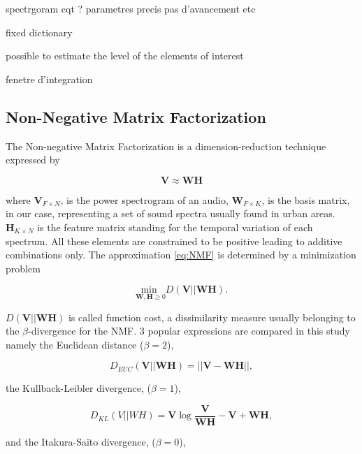 \documentclass{article}
\begin{document}
\begin{sloppy}
spectrgoram cqt ? parametres precis pas d'avancement etc

fixed dictionary

possible to estimate the level of the elements of interest

fenetre d'integration

\subsection{Non-Negative Matrix Factorization}
The Non-negative Matrix Factorization \cite{lee1999} is a dimension-reduction technique expressed by

\begin{equation}\label{eq:NMF}
\mathbf{V} \approx \mathbf{WH}
\end{equation}

where $\mathbf{V}_{F \times N}$, is the power spectrogram of an audio, $\mathbf{W}_{F \times K}$, is the basis matrix, in our case, representing a set of sound spectra usually found in urban areas. $\mathbf{H}_{K \times N}$ is the feature matrix standing for the temporal variation of each spectrum. All these elements are constrained to be positive leading to additive combinations only. The approximation \ref{eq:NMF} is determined by a minimization problem

\begin{equation}\label{eq:minCost}
\underset{\mathbf{W},\mathbf{H} \geq 0}{\text{min }} D(\mathbf{V}\vert\vert \mathbf{WH}).
\end{equation}

$D(\mathbf{V}\vert\vert \mathbf{WH})$ is called function cost, a dissimilarity measure usually belonging to the $\beta$-divergence for the NMF. 3 popular expressions are compared in this study namely the Euclidean distance ($\beta = 2$),

\begin{equation}\label{eq:distEUC}
D_{EUC}(\mathbf{V} \vert \vert \mathbf{WH}) =  \vert\vert \mathbf{V} - \mathbf{WH} \vert\vert , 
\end{equation} 

the Kullback-Leibler divergence, ($\beta = 1$), 

\begin{equation}\label{eq:divKL}
D_{KL}(V\vert\vert WH) = \mathbf{V}\log\frac{\mathbf{V}}{\mathbf{WH}}-\mathbf{V}+\mathbf{WH},
\end{equation}

and the Itakura-Saïto divergence, ($\beta = 0$), 
 

\end{sloppy}
\end{document}
